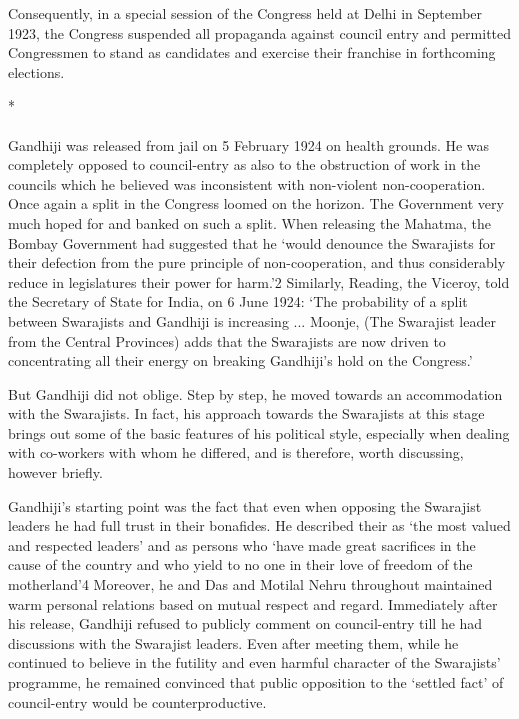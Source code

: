 Consequently, in a special session of the Congress held at Delhi in September 1923, the Congress suspended all propaganda against council entry and permitted Congressmen to stand as candidates and exercise their franchise in forthcoming elections.

\begin{center}*\end{center}

\paragraph*{}


Gandhiji was released from jail on 5 February 1924 on health grounds. He was completely opposed to council-entry as also to the obstruction of work in the councils which he believed was inconsistent with non-violent non-cooperation. Once again a split in the Congress loomed on the horizon. The Government very much hoped for and banked on such a split. When releasing the Mahatma, the Bombay Government had suggested that he `would denounce the Swarajists for their defection from the pure principle of non-cooperation, and thus considerably reduce in legislatures their power for harm.'2 Similarly, Reading, the Viceroy, told the Secretary of State for India, on 6 June 1924: `The probability of a split between Swarajists and Gandhiji is increasing ... Moonje, (The Swarajist leader from the Central Provinces) adds that the Swarajists are now driven to concentrating all their energy on breaking Gandhiji's hold on the Congress.'

But Gandhiji did not oblige. Step by step, he moved towards an accommodation with the Swarajists. In fact, his approach towards the Swarajists at this stage brings out some of the basic features of his political style, especially when dealing with co-workers with whom he differed, and is therefore, worth discussing, however briefly.

Gandhiji's starting point was the fact that even when opposing the Swarajist leaders he had full trust in their bonafides. He described their as `the most valued and respected leaders' and as persons who `have made great sacrifices in the cause of the country and who yield to no one in their love of freedom of the motherland'4 Moreover, he and Das and Motilal Nehru throughout maintained warm personal relations based on mutual respect and regard. Immediately after his release, Gandhiji refused to publicly comment on council-entry till he had discussions with the Swarajist leaders. Even after meeting them, while he continued to believe in the futility and even harmful character of the Swarajists' programme, he remained convinced that public opposition to the `settled fact' of council-entry would be counterproductive.

